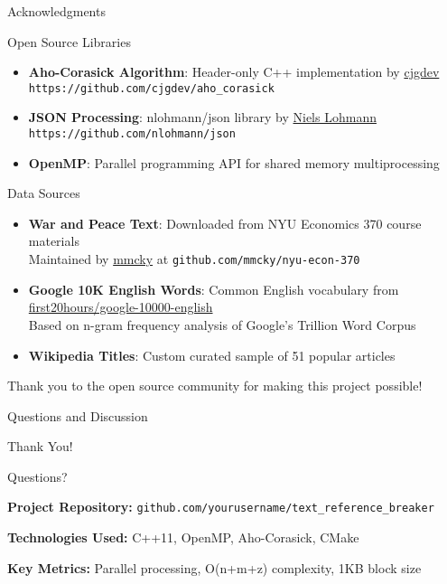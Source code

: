 \documentclass[aspectratio=169]{beamer}
\begin{document}
\begin{frame}{Acknowledgments}
\begin{block}{Open Source Libraries}
\begin{itemize}
    \item \textbf{Aho-Corasick Algorithm}: Header-only C++ implementation by \href{https://github.com/cjgdev}{cjgdev} \\
    \small{\texttt{https://github.com/cjgdev/aho\_corasick}}
    \item \textbf{JSON Processing}: nlohmann/json library by \href{https://github.com/nlohmann}{Niels Lohmann} \\
    \small{\texttt{https://github.com/nlohmann/json}}
    \item \textbf{OpenMP}: Parallel programming API for shared memory multiprocessing
\end{itemize}
\end{block}

\begin{block}{Data Sources}
\begin{itemize}
    \item \textbf{War and Peace Text}: Downloaded from NYU Economics 370 course materials \\
    \small{Maintained by \href{https://github.com/mmcky}{mmcky} at \texttt{github.com/mmcky/nyu-econ-370}}
    \item \textbf{Google 10K English Words}: Common English vocabulary from \href{https://github.com/first20hours/google-10000-english}{first20hours/google-10000-english} \\
    \small{Based on n-gram frequency analysis of Google's Trillion Word Corpus}
    \item \textbf{Wikipedia Titles}: Custom curated sample of 51 popular articles
\end{itemize}
\end{block}

\vspace{0.2cm}
\begin{center}
\small{Thank you to the open source community for making this project possible!}
\end{center}
\end{frame}

\begin{frame}{Questions and Discussion}
\begin{center}
\Huge Thank You!

\vspace{1cm}
\Large Questions?

\vspace{1cm}
\normalsize
\textbf{Project Repository:} \texttt{github.com/yourusername/text\_reference\_breaker}

\textbf{Technologies Used:} C++11, OpenMP, Aho-Corasick, CMake

\textbf{Key Metrics:} Parallel processing, O(n+m+z) complexity, 1KB block size
\end{center}
\end{frame}
\end{document}
